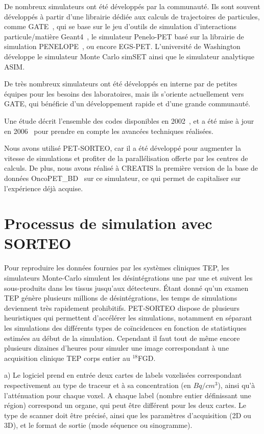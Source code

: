 De nombreux simulateurs ont été développés par la communauté. Ils sont souvent développés à partir d'une librairie dédiée aux calculs de trajectoires de particules, comme GATE~\cite{jan2004gate}, qui se base sur le jeu d'outils de simulation d'interactions particule/matière Geant4~\cite{allison2006geant4}, le simulateur Penelo-PET\cite{espana2009penelopet} basé sur la librairie de simulation  PENELOPE~\cite{salvat2006penelope}, ou encore EGS-PET. L’université de Washington développe le simulateur Monte Carlo simSET ainsi que le simulateur analytique ASIM. 

De très nombreux simulateurs ont été développés en interne par de petites équipes pour les besoins des laboratoires, mais ils s'oriente actuellement  vers GATE, qui bénéficie d'un développement rapide et d'une grande communauté.

Une étude décrit l'ensemble des codes disponibles en 2002~\cite{buvat2002monte}, et a été mise à jour en 2006~\cite{buvat2006monte} pour prendre en compte les avancées techniques réalisées.

Nous avons utilisé PET-SORTEO, car il a été développé pour augmenter la vitesse de simulations et profiter de la parallélisation offerte par les centres de calculs. De plus, nous avons réalisé à CREATIS la première version de la base de données OncoPET\_BD~\cite{tomei2010oncopet_db} sur ce simulateur, ce qui permet de capitaliser sur l’expérience déjà acquise. 

	\section{Processus de simulation avec SORTEO}
\label{lab:simuSORTEO}
Pour reproduire les données fournies par les systèmes cliniques TEP, les simulateurs Monte-Carlo simulent les désintégrations une par une et suivent les sous-produits dans les tissus jusqu'aux détecteurs. Étant donné qu'un examen TEP génère plusieurs millions de désintégrations, les temps de simulations deviennent très rapidement prohibitifs. PET-SORTEO dispose de plusieurs heuristiques qui permettent d'accélérer les simulations, notamment en séparant les simulations des différents types de coïncidences en fonction de statistiques estimées au début de la simulation. Cependant il faut tout de même encore plusieurs dizaines d'heures pour simuler une image correspondant à une acquisition clinique TEP corps entier au $^{18}$FGD.

a) Le logiciel prend en entrée deux cartes de labels voxelisées correspondant respectivement au type de traceur et à sa concentration (en $Bq/cm^3$), ainsi qu'à l'atténuation pour chaque voxel. A chaque label (nombre entier définissant une région) correspond un organe, qui peut être différent pour les deux cartes. Le type de scanner doit être précisé, ainsi que les paramètres d'acquisition (2D ou 3D), et le format de sortie (mode séquence ou sinogramme).

